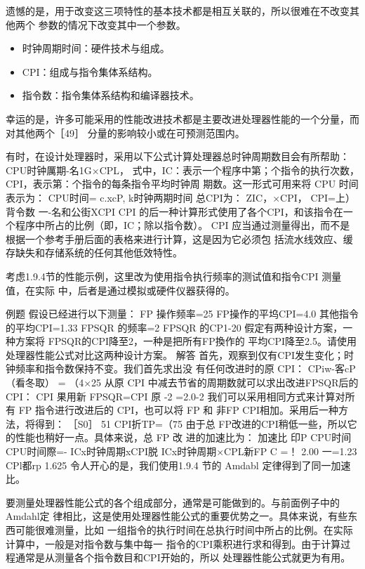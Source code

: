 遗憾的是，用于改变这三项特性的基本技术都是相互关联的，所以很难在不改变其他两个
参数的情况下改变其中一个参数。

\begin{itemize}
    \item 时钟周期时间：硬件技术与组成。
    \item CPI：组成与指令集体系结构。
    \item 指令数：指令集体系结构和编译器技术。
\end{itemize}

幸运的是，许多可能采用的性能改进技术都是主要改进处理器性能的一个分量，而对其他两个［49］
分量的影响较小或在可预测范围内。

有时，在设计处理器时，采用以下公式计算处理器总时钟周期数目会有所帮助：
CPU时钟厲期-名1G×CPL，
式中，IC：表示一个程序中第；个指令的执行次数，CPI，表示第：个指令的每条指令平均时钟周
期数。这一形式可用来将 CPU 时间表示为：
CPU时间=
c.xcP, k时钟两期时间
总CPI为：
ZIC，×CPI，
CPI=上）
背令数
一-名和公街XCPI
CPI 的后一种计算形式使用了各个CPI，和该指令在一个程序中所占的比例（即，IC；除以指令数）。
CPI 应当通过测量得出，而不是根据一个参考手册后面的表格来进行计算，这是因为它必须包
括流水线效应、缓存缺失和存储系统的任何其他低效特性。

考虑1.9.4节的性能示例，这里改为使用指令执行频率的测试值和指令CPI 测量值，在实际
中，后者是通过模拟或硬件仪器获得的。

例题
假设已经进行以下测量：
FP 操作频率=25%
FP操作的平坞CPI=4.0
其他指令的平均CPI=1.33
FPSQR 的频率=2%
FPSQR 的CP1-20
假定有两种设计方案，一种方案将 FPSQR的CPI降至2，一种是把所有FP換作的
平均CPI降至2.5。请使用处理器性能公式对比这两种设计方案。
解答
首先，观察到仅有CPI发生变化；时钟频率和指令数保持不变。我们首先求出没
有任何改进时的原 CPI：
CPiw-客cP（看冬取）
= （4×25%
从原 CPI 中减去节省的周期数就可以求出改进FPSQR后的CPI：
CPI 果用新 FPSQR=CPI 原 -2%
=2.0-2%
我们可以采用相同方式来计算对所有 FP 指令进行改进后的 CPI，也可以将 FP 和
非FP CPI相加。采用后一种方法，将得到：
［S0］
51
CPI折TP=（75%
由于总 FP改进的CPI稍低一些，所以它的性能也稍好一点。具体来说，总 FP 改
进的加速比为：
加速比 印P CPU时间
CPU时间際=-
ICx时钟周期xCPI脱
ICx时钟周期×CPL新FP
C =！
2.00
一=1.23
CPl都rp
1.625
令人开心的是，我们使用1.9.4 节的 Amdabl 定律得到了同一加速比。

要测量处理器性能公式的各个组成部分，通常是可能做到的。与前面例子中的Amdahl定
律相比，这是使用处理器性能公式的重要优势之一。具体来说，有些东西可能很难测量，比如
一组指令的执行时间在总执行时间中所占的比例。在实际计算中，一般是对指令数与集中每一
指令的CPI乘积进行求和得到。由于计算过程通常是从测量各个指令数目和CPI开始的，所以
处理器性能公式就更为有用。

